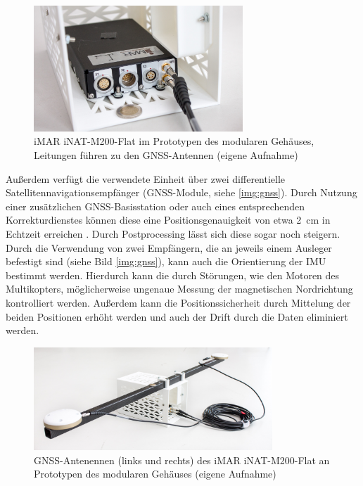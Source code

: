 \documentclass[a4paper,12pt,bibliography=totoc, listof=totoc,titlepage,pointlessnumbers]{scrreprt}
\begin{document}
\begin{figure}
 \centering
 \includegraphics[width=0.7\textwidth]{./img/imu.jpg}
 \caption{iMAR iNAT-M200-Flat im Prototypen des modularen Gehäuses, Leitungen füh\-ren zu den GNSS-Antennen (eigene Aufnahme)}
 \label{img:imu}
\end{figure}

Außerdem verfügt die verwendete Einheit über zwei differentielle Satellitennavigationsempfänger (GNSS-Module, siehe \autoref{img:gnss}). Durch Nutzung einer zu\-sätz\-lichen GNSS-Basisstation oder auch eines entsprechenden Korrekturdienstes können diese eine Positionsgenauigkeit von etwa 2~cm in Echtzeit erreichen \citep{imar}. Durch Postprocessing lässt sich diese sogar noch steigern. Durch die Verwendung von zwei Empfängern, die an jeweils einem Ausleger befestigt sind (siehe Bild \autoref{img:gnss}), kann auch die Orientierung der IMU bestimmt werden. Hierdurch kann die durch Störungen, wie den Motoren des Multikopters, möglicherweise ungenaue Messung der magnetischen Nordrichtung kontrolliert werden. Außerdem kann die Positionssicherheit durch Mittelung der beiden Positionen erhöht werden und auch der Drift durch die Daten eliminiert werden.

\begin{figure}
 \centering
 \includegraphics[width=0.8\textwidth]{./img/gnss.jpg}
 \caption{GNSS-Antenennen (links und rechts) des iMAR iNAT-M200-Flat an Prototypen des modularen Gehäuses (eigene Aufnahme)}
 \label{img:gnss}
\end{figure}
\end{document}

